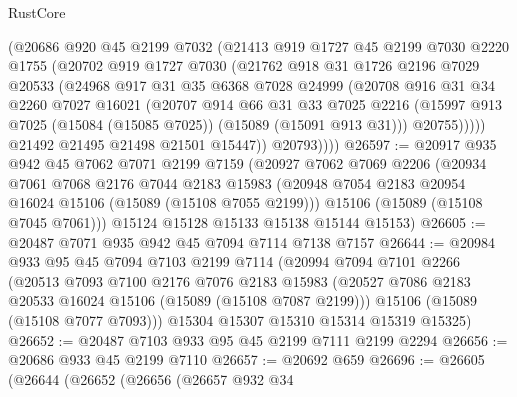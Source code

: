 \begin{lexlean}{RustCore}
\begin{coremodule}
            (@20686
              @920
              @45
              @2199
              @7032
              (@21413
                @919
                @1727
                @45
                @2199
                @7030
                @2220
                @1755
                (@20702
                  @919
                  @1727
                  @7030
                  (@21762
                    @918
                    @31
                    @1726
                    @2196
                    @7029
                    @20533
                    (@24968
                      @917
                      @31
                      @35
                      @6368
                      @7028
                      @24999
                      (@20708
                        @916
                        @31
                        @34
                        @2260
                        @7027
                        @16021
                        (@20707
                          @914
                          @66
                          @31
                          @33
                          @7025
                          @2216
                          (@15997 @913 @7025 (@15084 (@15085 @7025)) (@15089 (@15091 @913 @31)))
                          @20755)))))
                @21492
                @21495
                @21498
                @21501
                @15447))
            @20793))))
@26597 := @20917
    @935
    @942
    @45
    @7062
    @7071
    @2199
    @7159
    (@20927
      @7062
      @7069
      @2206
      (@20934
        @7061
        @7068
        @2176
        @7044
        @2183
        @15983
        (@20948 @7054 @2183 @20954 @16024 @15106 (@15089 (@15108 @7055 @2199)))
        @15106
        (@15089 (@15108 @7045 @7061)))
      @15124
      @15128
      @15133
      @15138
      @15144
      @15153)
@26605 := @20487 @7071 @935 @942 @45 @7094 @7114 @7138 @7157
@26644 := @20984
    @933
    @95
    @45
    @7094
    @7103
    @2199
    @7114
    (@20994
      @7094
      @7101
      @2266
      (@20513
        @7093
        @7100
        @2176
        @7076
        @2183
        @15983
        (@20527 @7086 @2183 @20533 @16024 @15106 (@15089 (@15108 @7087 @2199)))
        @15106
        (@15089 (@15108 @7077 @7093)))
      @15304
      @15307
      @15310
      @15314
      @15319
      @15325)
@26652 := @20487 @7103 @933 @95 @45 @2199 @7111 @2199 @2294
@26656 := @20686 @933 @45 @2199 @7110
@26657 := @20692 @659
@26696 := @26605
    (@26644
      (@26652
        (@26656
          (@26657
            @932
            @34

\end{coremodule}
\end{lexlean}
